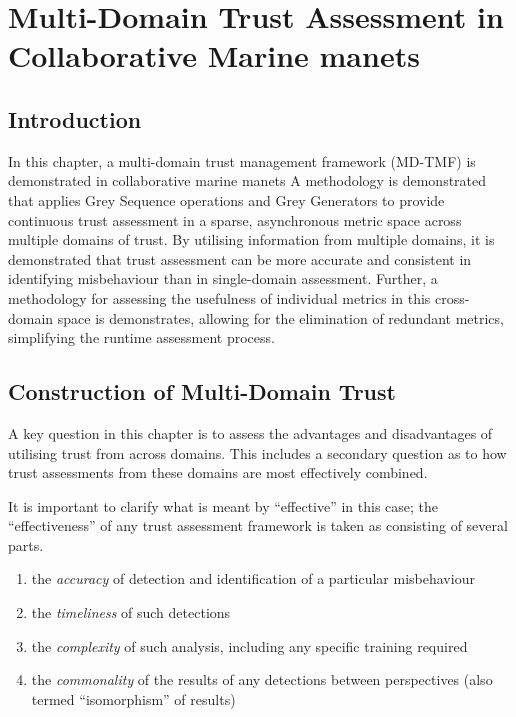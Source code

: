 \def\ChapterTitle{Multi-Domain Trust Assessment in Collaborative Marine \gls{manet}s}

\ifx\ifthesis\undefined

\else
\chapter{\ChapterTitle}
\label{Chapter\thechapter}
\fi

\section{Introduction}

In this chapter, a multi-domain trust management framework (MD-TMF) is demonstrated in collaborative marine \glspl{manet}
A methodology is demonstrated that applies Grey Sequence operations and Grey Generators to provide continuous trust assessment in a sparse, asynchronous metric space across multiple domains of trust.
By utilising information from multiple domains, it is demonstrated that trust assessment can be more accurate and consistent in identifying misbehaviour than in single-domain assessment.
Further, a methodology for assessing the usefulness of individual metrics in this cross-domain space is demonstrates, allowing for the elimination of redundant metrics, simplifying the runtime assessment process.

\section{Construction of Multi-Domain Trust}

A key question in this chapter is to assess the advantages and disadvantages of utilising trust from across domains. 
This includes a secondary question as to how trust assessments from these domains are most effectively combined. 

It is important to clarify what is meant by ``effective'' in this case; the ``effectiveness'' of any trust assessment framework is taken as consisting of several parts.

\begin{enumerate}
  \item the \emph{accuracy} of detection and identification of a particular misbehaviour
  \item the \emph{timeliness} of such detections
  \item the \emph{complexity} of such analysis, including any specific training required
  \item the \emph{commonality} of the results of any detections between perspectives (also termed ``isomorphism'' of results)
\end{enumerate}



